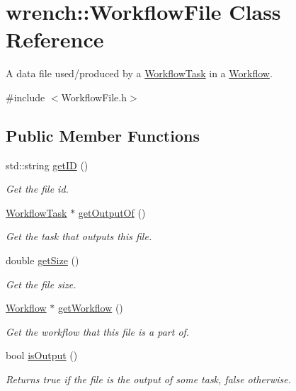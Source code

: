 \hypertarget{classwrench_1_1_workflow_file}{}\section{wrench\+:\+:Workflow\+File Class Reference}
\label{classwrench_1_1_workflow_file}


A data file used/produced by a \hyperlink{classwrench_1_1_workflow_task}{Workflow\+Task} in a \hyperlink{classwrench_1_1_workflow}{Workflow}.  




{\ttfamily \#include $<$Workflow\+File.\+h$>$}

\subsection*{Public Member Functions}
\begin{DoxyCompactItemize}
\item 
std\+::string \hyperlink{classwrench_1_1_workflow_file_acafb99b2fc9a9482849c02af882d373f}{get\+ID} ()
\begin{DoxyCompactList}\small\item\em Get the file id. \end{DoxyCompactList}\item 
\hyperlink{classwrench_1_1_workflow_task}{Workflow\+Task} $\ast$ \hyperlink{classwrench_1_1_workflow_file_a37f8fb29dac0d933bc0ae7d138baad31}{get\+Output\+Of} ()
\begin{DoxyCompactList}\small\item\em Get the task that outputs this file. \end{DoxyCompactList}\item 
double \hyperlink{classwrench_1_1_workflow_file_a97d236163b9a70b95a30f6949f38e81e}{get\+Size} ()
\begin{DoxyCompactList}\small\item\em Get the file size. \end{DoxyCompactList}\item 
\hyperlink{classwrench_1_1_workflow}{Workflow} $\ast$ \hyperlink{classwrench_1_1_workflow_file_ac8c018abfade90cb0594c812ec5e5eaf}{get\+Workflow} ()
\begin{DoxyCompactList}\small\item\em Get the workflow that this file is a part of. \end{DoxyCompactList}\item 
bool \hyperlink{classwrench_1_1_workflow_file_a192a7a39bef01be6fc5ab31b11bc86fa}{is\+Output} ()
\begin{DoxyCompactList}\small\item\em Returns true if the file is the output of some task, false otherwise. \end{DoxyCompactList}\end{DoxyCompactItemize}


